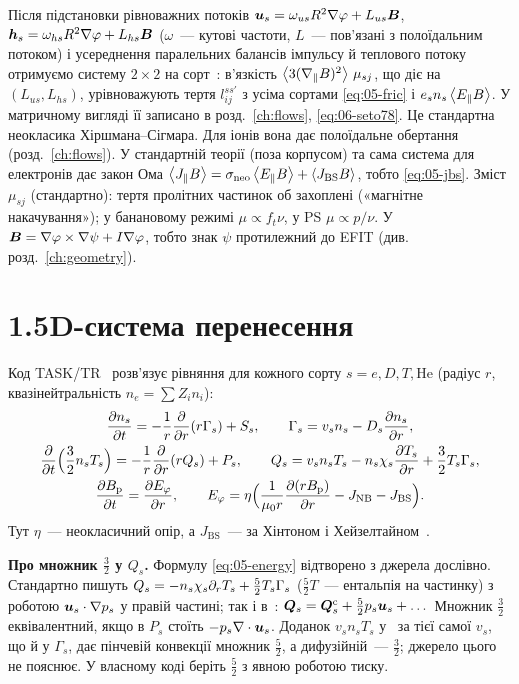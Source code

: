 Після підстановки рівноважних потоків $\bm{u}_s=\omega_{us}R^2\nabla\varphi+L_{us}\bm{B}$, $\bm{h}_s=\omega_{hs}R^2\nabla\varphi+L_{hs}\bm{B}$ ($\omega$~--- кутові частоти, $L$~--- пов'язані з полоїдальним потоком) і усереднення паралельних балансів імпульсу й теплового потоку отримуємо систему $2\times2$ на сорт~\cite[с.~7, (73)--(78)]{Seto2014}: в'язкість $\left\langle 3(\nabla_\parallel B)^2 \right\rangle\,\mu_{sj}$, що діє на $(L_{us},L_{hs})$, урівноважують тертя $l^{ss'}_{ij}$ з усіма сортами \eqref{eq:05-fric} і $e_sn_s\left\langle E_{\parallel} B \right\rangle$. У матричному вигляді її записано в розд.~\ref{ch:flows}, \eqref{eq:06-seto78}. Це стандартна неокласика Хіршмана--Сігмара. Для іонів вона дає полоїдальне обертання (розд.~\ref{ch:flows}). У стандартній теорії (поза корпусом) та сама система для електронів дає закон Ома $\left\langle J_\parallel B \right\rangle=\sigma_{\mathrm{neo}}\left\langle E_{\parallel} B \right\rangle+\left\langle J_{\mathrm{BS}}B \right\rangle$, тобто \eqref{eq:05-jbs}. Зміст $\mu_{sj}$ (стандартно): тертя пролітних частинок об захоплені («магнітне накачування»); у банановому режимі $\mu\propto f_t\nu$, у PS $\mu\propto p/\nu$. У~\cite{Seto2014} $\bm{B}=\nabla\varphi\times\nabla\psi+I\nabla\varphi$, тобто знак $\psi$ протилежний до EFIT (див. розд.~\ref{ch:geometry}).

\section{1.5D-система перенесення}\label{sec:05-15d}

Код TASK/TR~\cite[с.~3--4, (1)--(6)]{Fukuyama1992} розв'язує рівняння для кожного сорту $s=e,D,T,\mathrm{He}$ (радіус $r$, квазінейтральність $n_e=\sum Z_in_i$):
\begin{gather}
  \frac{\partial n_s}{\partial t}=-\frac1r\frac{\partial}{\partial r}(r\Gamma_s)+S_s,\qquad \Gamma_s=v_sn_s-D_s\frac{\partial n_s}{\partial r},\label{eq:05-cont}\\
  \frac{\partial}{\partial t}\Big(\frac32n_sT_s\Big)=-\frac1r\frac{\partial}{\partial r}(rQ_s)+P_s,\qquad Q_s=v_sn_sT_s-n_s\chi_{s}\frac{\partial T_s}{\partial r}+\frac32T_s\Gamma_s,\label{eq:05-energy}\\
  \frac{\partial B_{\mathrm{p}}}{\partial t}=\frac{\partial E_\varphi}{\partial r},\qquad E_\varphi=\eta\Big(\frac{1}{\mu_0r}\frac{\partial(rB_{\mathrm{p}})}{\partial r}-J_{\mathrm{NB}}-J_{\mathrm{BS}}\Big).\label{eq:05-Bp}
\end{gather}
Тут $\eta$~--- неокласичний опір, а $J_{\mathrm{BS}}$~--- за Хінтоном і Хейзелтайном~\cite[с.~4, 6]{Fukuyama1992}.

\textbf{Про множник $\tfrac32$ у $Q_s$.} Формулу \eqref{eq:05-energy} відтворено з джерела дослівно. Стандартно пишуть $Q_s=-n_s\chi_{s}\partial_rT_s+\tfrac52T_s\Gamma_s$ ($\tfrac52T$~--- ентальпія на частинку) з роботою $\bm{u}_s\cdot\nabla p_s$ у правій частині; так і в~\cite[с.~3, (10), (13)]{Seto2014}: $\bm{Q}_s=\bm{Q}^{\mathrm c}_s+\tfrac52p_s\bm{u}_s+\dots$ Множник $\tfrac32$ еквівалентний, якщо в $P_s$ стоїть $-p_s\nabla\cdot\bm{u}_s$. Доданок $v_sn_sT_s$ у~\cite{Fukuyama1992} за тієї самої $v_s$, що й у $\Gamma_s$, дає пінчевій конвекції множник $\tfrac52$, а дифузійній~--- $\tfrac32$; джерело цього не пояснює. У власному коді беріть $\tfrac52$ з явною роботою тиску.

